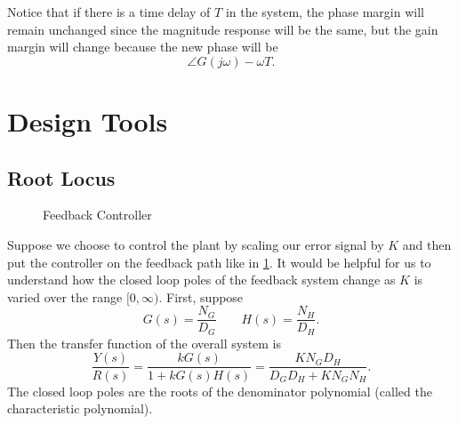 Notice that if there is a time delay of $T$ in the system, the phase margin will remain unchanged since the magnitude response will be the same, but the gain margin will change because the new phase will be
\[
  \angle G(j\omega) - \omega T.
\]
\section{Design Tools}
\subsection{Root Locus}
\begin{gitbook-image}
\begin{figure}[H]
    \centering 
    \caption{Feedback Controller}
    \label{fig:rl-feedback-controller}
\end{figure}
\end{gitbook-image}
Suppose we choose to control the plant by scaling our error signal by $K$ and then put the controller on the feedback path like in \cref{fig:rl-feedback-controller}.
It would be helpful for us to understand how the closed loop poles of the feedback system change as $K$ is varied over the range $[0, \infty)$.
First, suppose
\[
  G(s) = \frac{N_G}{D_G} \qquad H(s) = \frac{N_H}{D_H}.
\]
Then the transfer function of the overall system is
\[
  \frac{Y(s)}{R(s)} = \frac{kG(s)}{1+kG(s)H(s)} = \frac{KN_GD_H}{D_GD_H+KN_GN_H}.
\]
The closed loop poles are the roots of the denominator polynomial (called the characteristic polynomial).
